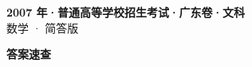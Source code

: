 \documentclass[zihao=-4, a4paper]{ctexart}
\begin{document}
\begin{center}
  {\Large\bfseries 2007 年·普通高等学校招生考试·广东卷·文科}\\[4pt]
  {\large 数学 · 简答版}
\end{center}
\medskip
{}

\clearpage
{}
\begin{center}{\Large\bfseries 答案速查}\end{center}
\medskip

\end{document}
